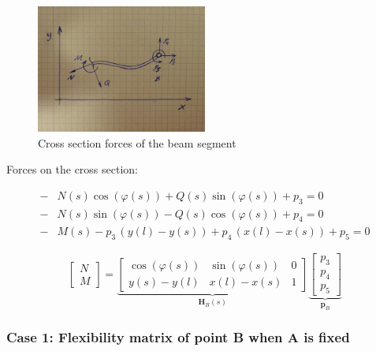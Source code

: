 \begin{figure}[h]
\centering
\includegraphics[width=0.5\textwidth]{figures/elements/beam-linear-2}
\caption{Cross section forces of the beam segment}
\label{fig:beam-linear-2}
\end{figure}

Forces on the cross section:

\begin{align*}
-&N(s)\cos(\varphi(s)) + Q(s)\sin(\varphi(s)) + p_3 = 0 \\
-&N(s)\sin(\varphi(s)) - Q(s)\cos(\varphi(s)) + p_4 = 0 \\
-&M(s) - p_3\,(y(l)-y(s)) + p_4\,(x(l) - x(s)) + p_5 = 0
\end{align*}

\begin{equation}
\begin{bmatrix}
N \\ M
\end{bmatrix}
=
\underbrace{
\begin{bmatrix}
\cos(\varphi(s)) & \sin(\varphi(s)) & 0 \\
y(s) - y(l) & x(l) - x(s) & 1
\end{bmatrix}
}_{\boldsymbol{H}_B(s)}
\underbrace{
\begin{bmatrix}
p_3 \\ p_4 \\ p_5
\end{bmatrix}
}_{\boldsymbol{p}_B}
\end{equation}


\subsubsection*{Case 1: Flexibility matrix of point B when A is fixed}

